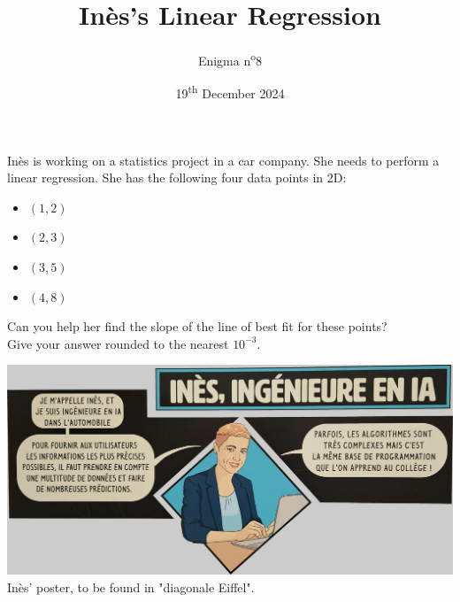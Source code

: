 \documentclass[a4paper, top=10mm]{article}
\title{\textbf{\huge{Inès's Linear Regression}}}
\author{Enigma n\textsuperscript{o}8}
\date{19\textsuperscript{th} December 2024}
\begin{document}
	\maketitle
	
	Inès is working on a statistics project in a car company.
	She needs to perform a linear regression.
	She has the following four data points in 2D:
	\begin{itemize}
		\item $(1, 2)$
		\item $(2, 3)$
		\item $(3, 5)$
		\item $(4, 8)$
	\end{itemize}
	
	Can you help her find the slope of the line of best fit for these points?\\
	Give your answer rounded to the nearest $10^{-3}$.
	
	\begin{center}
		\includegraphics[width=0.8\linewidth]{08ines_ia.png}\\
		Inès' poster, to be found in "diagonale Eiffel".
	\end{center}
	
	
\end{document}
